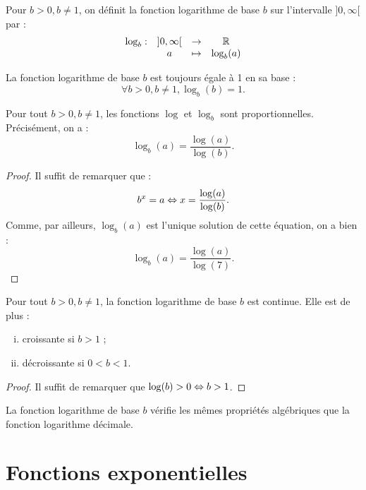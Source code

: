 \documentclass[a4paper, 12pt]{report}
\begin{document}
\begin{defn}
Pour $b>0, b \neq 1$, on définit la fonction logarithme de base $b$ sur l'intervalle $]0, \infty[$ par :
\[ \begin{array}{c c c c} \log_b : & ]0, \infty[ & \to & \mathbb{R} \\ & a & \mapsto & \log_b(a) \end{array} \]
\end{defn}

\begin{rmq}
La fonction logarithme de base $b$ est toujours égale à 1 en sa base :
\[ \forall b>0, b \neq 1, \log_b(b) = 1. \]
\end{rmq}

\begin{prop}
Pour tout $b>0, b \neq 1$, les fonctions $\log$ et $\log_b$ sont proportionnelles. Précisément, on a :
\[ \log_b(a) = \dfrac{\log(a)}{\log(b)}. \]
\end{prop}

\begin{proof}
Il suffit de remarquer que :
\[ b^x = a \Leftrightarrow x = \dfrac{\log(a)}{\log(b)} . \]
Comme, par ailleurs, $\log_b(a)$ est l'unique solution de cette équation, on a bien :
\[ \log_b(a) = \dfrac{\log(a)}{\log(7)} . \]
\end{proof}

\begin{coro}
Pour tout $b>0, b \neq 1$, la fonction logarithme de base $b$ est continue. Elle est de plus :
\begin{enumerate}[(i)]
\item croissante si $b > 1$ ;
\item décroissante si $0<b<1$.
\end{enumerate}
\end{coro}

\begin{proof}
Il suffit de remarquer que $\log(b) > 0 \Leftrightarrow b > 1$.
\end{proof}

\begin{coro}
La fonction logarithme de base $b$ vérifie les mêmes propriétés algébriques que la fonction logarithme décimale.
\end{coro}

\chapter{Fonctions exponentielles}
\end{document}
